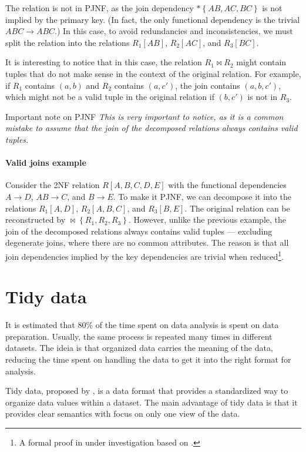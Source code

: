 The relation is not in PJNF, as the join dependency $* \left\{ AB, AC, BC \right\}$ is not
implied by the primary key.  (In fact, the only functional dependency is the trivial $ABC
\to ABC$.)  In this case, to avoid redundancies and inconsistencies, we must split the
relation into the relations $R_1[AB]$, $R_2[AC]$, and $R_3[BC]$.

It is interesting to notice that in this case, the relation $R_1 \bowtie R_2$ might
contain tuples that do not make sense in the context of the original relation.  For
example, if $R_1$ contains $(a, b)$ and $R_2$ contains $(a, c')$, the join contains
$(a, b, c')$, which might not be a valid tuple in the original relation if $(b, c')$ is
not in $R_3$.

\begin{hlbox}{Important note on PJNF}
  \em
  This is very important to notice, as it is a common mistake to assume
  that the join of the decomposed relations always contains valid tuples.
\end{hlbox}

\paragraph{Valid joins example}  Consider the 2NF relation $R[A, B, C, D, E]$ with the functional
dependencies $A \to D$, $AB \to C$, and $B \to E$.  To make it PJNF, we can decompose it
into the relations $R_1[A, D]$, $R_2[A, B, C]$, and $R_3[B, E]$.  The original relation can
be reconstructed by $\bowtie \left\{ R_1, R_2, R_3 \right\}$.  However, unlike the
previous example, the join of the decomposed relations always contains valid tuples
--- excluding degenerate joins, where there are no common attributes.
The reason is that all join dependencies implied by the key dependencies are trivial when
reduced\footnote{\color{red}A formal proof in under investigation based on .}.

\section{Tidy data}

It is estimated that 80\% of the time spent on data analysis is spent on data preparation.
Usually, the same process is repeated many times in different datasets. The ideia is that
organized data carries the meaning of the data, reducing the time spent on handling
the data to get it into the right format for analysis.

Tidy data, proposed by \textcite{Wickham2014},
is a data format that provides a standardized way to organize data values within
a dataset.  The main advantage of tidy data is that it provides clear semantics with focus
on only one view of the data.

